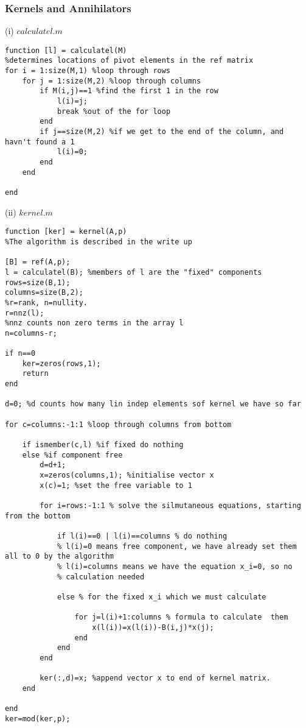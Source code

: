\documentclass[10pt,a4paper]{report}
\begin{document}
\subsubsection{Kernels and Annihilators}
\vspace{0.5cm}

(i) $calculatel.m$
\begin{verbatim}
function [l] = calculatel(M)
%determines locations of pivot elements in the ref matrix
for i = 1:size(M,1) %loop through rows
    for j = 1:size(M,2) %loop through columns
        if M(i,j)==1 %find the first 1 in the row
            l(i)=j; 
            break %out of the for loop
        end
        if j==size(M,2) %if we get to the end of the column, and havn't found a 1
            l(i)=0;
        end
    end

end
\end{verbatim}
\vspace{0.5cm}

(ii) $kernel.m$
\begin{verbatim}
function [ker] = kernel(A,p)
%The algorithm is described in the write up

[B] = ref(A,p);
l = calculatel(B); %members of l are the "fixed" components
rows=size(B,1);
columns=size(B,2);
%r=rank, n=nullity.
r=nnz(l);
%nnz counts non zero terms in the array l
n=columns-r;

if n==0
    ker=zeros(rows,1);
    return 
end

d=0; %d counts how many lin indep elements sof kernel we have so far

for c=columns:-1:1 %loop through columns from bottom
 
    if ismember(c,l) %if fixed do nothing
    else %if component free
        d=d+1;
        x=zeros(columns,1); %initialise vector x
        x(c)=1; %set the free variable to 1
    
        for i=rows:-1:1 % solve the silmutaneous equations, starting from the bottom
            
            if l(i)==0 | l(i)==columns % do nothing
            % l(i)=0 means free component, we have already set them all to 0 by the algorithm
            % l(i)=columns means we have the equation x_i=0, so no 
            % calculation needed 
            
            else % for the fixed x_i which we must calculate

                for j=l(i)+1:columns % formula to calculate  them
                    x(l(i))=x(l(i))-B(i,j)*x(j);
                end
            end
        end
    
        ker(:,d)=x; %append vector x to end of kernel matrix.
    end
    
end
ker=mod(ker,p);
\end{verbatim}
\vspace{0.5cm}
\end{document}
